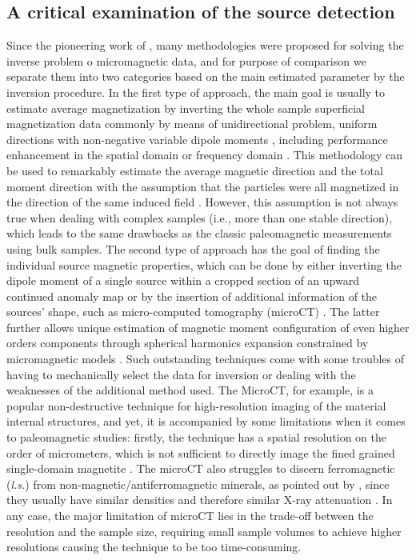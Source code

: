 \subsection{A critical examination of the source detection}

Since the pioneering work of \cite{Egli2000}, many methodologies were proposed for solving the inverse problem o micromagnetic data, and for purpose of comparison we separate them into two categories based on the main estimated parameter by the inversion procedure.
In the first type of approach, the main goal is usually to estimate average magnetization by inverting the whole sample superficial magnetization data commonly by means of unidirectional problem, uniform directions with non-negative variable dipole moments \citep[e.g.,][]{Weiss2007}, including performance enhancement in the spatial domain \citep[e.g.,][]{Myre2019} or frequency domain  \citep[e.g.,][]{Lima2013}.
This methodology can be used to remarkably estimate the average magnetic direction and the total moment direction with the assumption that the particles were all magnetized in the direction of the same induced field \citep[sIRM and/or NRM in basalts,][]{Weiss2007}.
However, this assumption is not always true when dealing with complex samples (i.e., more than one stable direction), which leads to the same drawbacks as the classic paleomagnetic measurements using bulk samples.
The second type of approach has the goal of finding the individual source magnetic properties, which can be done by either inverting the dipole moment of a single source within a cropped section of an upward continued anomaly map \citep[e.g.,][]{Lima2016, Fu2020} or by the insertion of additional information of the sources’ shape, such as micro-computed tomography (microCT) \citep[e.g.,][]{Fabian2019, DeGroot2018, DeGroot2021}.
The latter further allows unique estimation of magnetic moment configuration of even higher orders components through spherical harmonics expansion constrained by micromagnetic models \citep[e.g.,][]{CortesOrtuno2021, CortesOrtuno2022}.
Such outstanding techniques come with some troubles of having to mechanically select the data for inversion or dealing with the weaknesses of the additional method used.
The MicroCT, for example, is a popular non-destructive technique for high-resolution imaging of the material internal structures, and yet, it is accompanied by some limitations when it comes to paleomagnetic studies: firstly, the technique has a spatial resolution on the order of micrometers, which is not sufficient to directly image the fined grained single-domain magnetite \citep{DeGroot2018}.
The microCT also struggles to discern ferromagnetic (\textit{l.s.}) from non-magnetic/antiferromagnetic minerals, as pointed out by \cite{DeGroot2021}, since they usually have similar densities and therefore similar X-ray attenuation \citep{Cnudde2013}.
In any case, the major limitation of microCT lies in the trade-off between the resolution and the sample size, requiring small sample volumes to achieve higher resolutions causing the technique to be too time-consuming.

